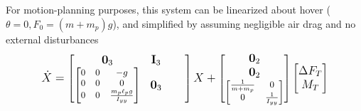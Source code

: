 \documentclass[letterpaper, 10 pt, conference]{ieeeconf}\usepackage[margin=1in]{geometry}
\begin{document}
For motion-planning purposes, this system can be linearized about hover ($\theta = 0, F_0 = (m+m_p)g$), and simplified by assuming negligible air drag and no external disturbances
\begin{equation}
	\dot X = \begin{bmatrix}
		\mathbf{0}_3 & \mathbf{I}_3 \qquad \\ \footnotesize
		\begin{bmatrix} 0 & 0 & -g \\
		0 & 0 & 0 \\
		0 & 0 & \frac{m_p \ell_p g}{I_{yy}} \end{bmatrix}\normalsize & \mathbf{0}_3 \qquad
	\end{bmatrix} X + \begin{bmatrix}
		\mathbf{0}_2 \\ \mathbf{0}_2 \\
		\footnotesize \begin{bmatrix}\frac{1}{m+m_p} & 0 \\ 0 & \frac{1}{I_{yy}} \end{bmatrix} \normalsize
	\end{bmatrix} \begin{bmatrix}
		\Delta F_T \\ M_T
	\end{bmatrix}
\end{equation}
\end{document}
